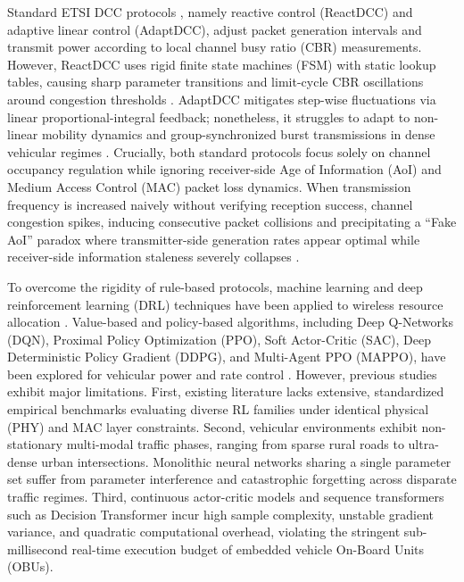 \documentclass[journal]{IEEEtran}
\begin{document}
Standard ETSI DCC protocols \cite{ETSI_TS_102_687, ETSI_TS_103_175}, namely reactive control (ReactDCC) and adaptive linear control (AdaptDCC), adjust packet generation intervals and transmit power according to local channel busy ratio (CBR) measurements. However, ReactDCC uses rigid finite state machines (FSM) with static lookup tables, causing sharp parameter transitions and limit-cycle CBR oscillations around congestion thresholds \cite{Bansal2013LIMERIC}. AdaptDCC mitigates step-wise fluctuations via linear proportional-integral feedback; nonetheless, it struggles to adapt to non-linear mobility dynamics and group-synchronized burst transmissions in dense vehicular regimes \cite{Ye2019Deep}. Crucially, both standard protocols focus solely on channel occupancy regulation while ignoring receiver-side Age of Information (AoI) and Medium Access Control (MAC) packet loss dynamics. When transmission frequency is increased naively without verifying reception success, channel congestion spikes, inducing consecutive packet collisions and precipitating a ``Fake AoI'' paradox where transmitter-side generation rates appear optimal while receiver-side information staleness severely collapses \cite{Zheng2022Age}.

To overcome the rigidity of rule-based protocols, machine learning and deep reinforcement learning (DRL) techniques have been applied to wireless resource allocation \cite{Hu2021Deep, Wang2023Multi, Mnih2015Human}. Value-based and policy-based algorithms, including Deep Q-Networks (DQN), Proximal Policy Optimization (PPO), Soft Actor-Critic (SAC), Deep Deterministic Policy Gradient (DDPG), and Multi-Agent PPO (MAPPO), have been explored for vehicular power and rate control \cite{VanHasselt2016Deep, Wang2016Dueling, Yu2022Surprising, Lowe2017Multi, Rashid2018QMIX}. However, previous studies exhibit major limitations. First, existing literature lacks extensive, standardized empirical benchmarks evaluating diverse RL families under identical physical (PHY) and MAC layer constraints. Second, vehicular environments exhibit non-stationary multi-modal traffic phases, ranging from sparse rural roads to ultra-dense urban intersections. Monolithic neural networks sharing a single parameter set suffer from parameter interference and catastrophic forgetting across disparate traffic regimes. Third, continuous actor-critic models and sequence transformers such as Decision Transformer \cite{Chen2021Decision, Janner2021Offline} incur high sample complexity, unstable gradient variance, and quadratic computational overhead, violating the stringent sub-millisecond real-time execution budget of embedded vehicle On-Board Units (OBUs).
\end{document}
